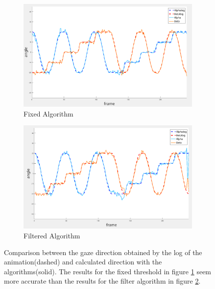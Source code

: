 \begin{figure}
	\begin{subfigure}{.5\textwidth}
		\centering
		\includegraphics[width=\linewidth]{images/fixed_middle.png}
		\caption{Fixed Algorithm}
		\label{fig:fixedMiddle}
	\end{subfigure}
	\begin{subfigure}{.5\textwidth}
		\centering
		\includegraphics[width=\linewidth]{images/normal_middle.png}
		\caption{Filtered Algorithm}
		\label{fig:normalMiddle}
	\end{subfigure}

	\caption{Comparison between the gaze direction obtained by the log of the animation(dashed) and calculated direction with the algorithms(solid). The results for the fixed threshold in figure \ref{fig:fixedMiddle} seem more accurate than the results for the filter algorithm in figure \ref{fig:normalMiddle}.}
	\label{fig:VGA}
\end{figure}

